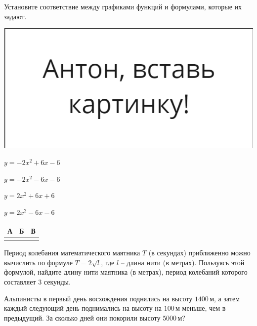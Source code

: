 \begin{class}[number=3]
\begin{listofex}
			\item 
			\begin{minipage}[t]{0.57\textwidth}
				Установите соответствие между графиками функций и формулами, которые их задают.
			\end{minipage}
			\begin{minipage}[c]{0.3\textwidth}
				\includegraphics[align=t, width=\textwidth]{pics/G91M4L4-1}
			\end{minipage}
			\begin{enumcols}[itemcolumns=1]
				\item \( y=-2x^2+6x-6 \)
				\item \( y=-2x^2-6x-6 \)
				\item \( y=2x^2+6x+6 \)
				\item \( y=2x^2-6x-6 \)
			\end{enumcols}
			\begin{center}
				\footnotesize
				\begin{tabular}{|c|c|c|}
					\hline
					А&Б&В\\
					\hline
					 & & \\
					\hline
				\end{tabular}
			\end{center}
		
			\item Период колебания математического маятника \( T \) (в секундах) приближенно можно вычислить по формуле \( T=2\sqrt{l} \), где \( l \) -- длина нити (в метрах). Пользуясь этой формулой, найдите длину нити маятника (в метрах), период колебаний которого составляет \( 3 \) секунды.
			
			\item Альпинисты в первый день восхождения поднялись на высоту \( 1400 \) м, а затем каждый следующий день поднимались на высоту на \( 100 \) м меньше, чем в предыдущий. За сколько дней они покорили высоту \( 5000 \) м?
			

\end{listofex}
\end{class}
